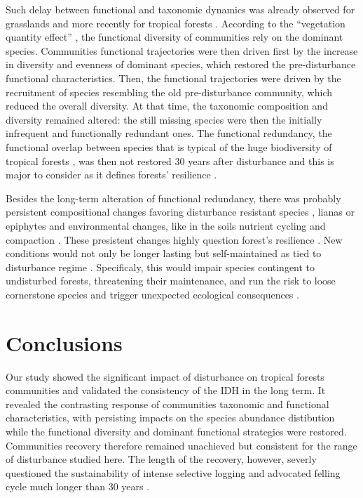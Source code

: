 \documentclass[fleqn,10pt]{ArtEcoFoG} %
\theoremstyle{definition}
\theoremstyle{definition}
\theoremstyle{definition}
\theoremstyle{remark}
\begin{document}
Such delay between functional and taxonomic dynamics was already
observed for grasslands \citep{Tilman1997, Mouillot2011} and more
recently for tropical forests \citep{Lohbeck2015, Guariguata2001}.
According to the ``vegetation quantity effect'' \citep{Grime1998}, the
functional diversity of communities rely on the dominant species.
Communities functional trajectories were then driven first by the
increase in diversity and evenness of dominant species, which restored
the pre-disturbance functional characteristics. Then, the functional
trajectories were driven by the recruitment of species resembling the
old pre-disturbance community, which reduced the overall diversity. At
that time, the taxonomic composition and diversity remained altered: the
still missing species were then the initially infrequent and
functionally redundant ones. The functional redundancy, the functional
overlap between species that is typical of the huge biodiversity of
tropical forests \citep{Bellwood2006}, was then not restored 30 years
after disturbance and this is major to consider as it defines forests'
resilience \citep{Trenbath1999, Elmqvist2003, Diaz2005}.

Besides the long-term alteration of functional redundancy, there was
probably persistent compositional changes favoring disturbance resistant
species \citep{Haddad2008}, lianas or epiphytes \citep{Martin2013} and
environmental changes, like in the soils nutrient cycling and compaction
\citep{Olander2005}. These presistent changes highly question forest's
resilience \citep{Chazdon2003a}. New conditions would not only be longer
lasting but self-maintained as tied to disturbance regime
\citep{Burslem2000}. Specificaly, this would impair species contingent
to undisturbed forests, threatening their maintenance, and run the risk
to loose cornerstone species and trigger unexpected ecological
consequences \citep{Jones1994, Diaz2005, Gardner2007}.

\section{Conclusions}\label{conclusions}

Our study showed the significant impact of disturbance on tropical
forests communities and validated the consistency of the IDH in the long
term. It revealed the contrasting response of communities taxonomic and
functional characteristics, with persisting impacts on the species
abundance distibution while the functional diversity and dominant
functional strategies were restored. Communities recovery therefore
remained unachieved but consistent for the range of disturbance studied
here. The length of the recovery, however, severly questioned the
sustainability of intense selective logging and advocated felling cycle
much longer than 30 years \citep{Gourlet-Fleury2005}.
\end{document}

